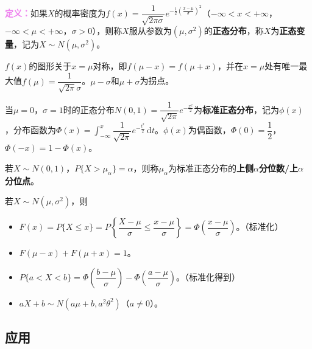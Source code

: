 \documentclass[UTF8, 12pt]{ctexart}
\begin{document}
\textcolor{violet}{\textbf{定义：}}如果$X$的概率密度为$f(x)=\dfrac{1}{\sqrt{2\pi\sigma}}e^{-\frac{1}{2}(\frac{x-\mu}{\sigma})^2}$（$-\infty<x<+\infty$，$-\infty<\mu<+\infty$，$\sigma>0$），则称$X$服从参数为$(\mu,\sigma^2)$的\textbf{正态分布}，称$X$为\textbf{正态变量}，记为$X\sim N(\mu,\sigma^2)$。

$f(x)$的图形关于$x=\mu$对称，即$f(\mu-x)=f(\mu+x)$，并在$x=\mu$处有唯一最大值$f(\mu)=\dfrac{1}{\sqrt{2\pi}\sigma}$。$\mu-\sigma$和$\mu+\sigma$为拐点。


当$\mu=0$，$\sigma=1$时的正态分布$N(0,1)=\dfrac{1}{\sqrt{2\pi}}e^{-\frac{x^2}{2}}$为\textbf{标准正态分布}，记为$\phi(x)$，分布函数为$\varPhi(x)=\displaystyle{\int_{-\infty}^x\dfrac{1}{\sqrt{2\pi}}e^{-\frac{t^2}{2}}\,\textrm{d}t}$。$\phi(x)$为偶函数，$\varPhi(0)=\dfrac{1}{2}$，$\varPhi(-x)=1-\varPhi(x)$。

若$X\sim N(0,1)$，$P\{X>\mu_\alpha\}=\alpha$，则称$\mu_\alpha$为标准正态分布的\textbf{上侧$\alpha$分位数/上$\alpha$分位点}。

若$X\sim N(\mu,\sigma^2)$，则

\begin{itemize}
    \item $F(x)=P\{X\leqslant x\}=P\left\{\dfrac{X-\mu}{\sigma}\leqslant\dfrac{x-\mu}{\sigma}\right\}=\varPhi\left(\dfrac{x-\mu}{\sigma}\right)$。（标准化）
    \item $F(\mu-x)+F(\mu+x)=1$。
    \item $P\{a<X<b\}=\varPhi\left(\dfrac{b-\mu}{\sigma}\right)-\varPhi\left(\dfrac{a-\mu}{\sigma}\right)$。（标准化得到）
    \item $aX+b\sim N(a\mu+b,a^2\theta^2)$（$a\neq0$）。
\end{itemize}

\subsection{应用}
\end{document}
